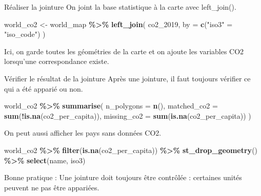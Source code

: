 \documentclass[
  10pt,
  ignorenonframetext,
]{beamer}
\newenvironment{Shaded}{\begin{snugshade}}{\end{snugshade}}
\newcommand{\AttributeTok}[1]{\textcolor[rgb]{0.13,0.29,0.53}{#1}}
\newcommand{\FunctionTok}[1]{\textcolor[rgb]{0.13,0.29,0.53}{\textbf{#1}}}
\newcommand{\NormalTok}[1]{#1}
\newcommand{\OtherTok}[1]{\textcolor[rgb]{0.56,0.35,0.01}{#1}}
\newcommand{\SpecialCharTok}[1]{\textcolor[rgb]{0.81,0.36,0.00}{\textbf{#1}}}
\newcommand{\StringTok}[1]{\textcolor[rgb]{0.31,0.60,0.02}{#1}}
\begin{document}
\begin{frame}[fragile]{Réaliser la jointure}
\label{ruxe9aliser-la-jointure}
On joint la base statistique à la carte avec left\_join().

\begin{Shaded}
\begin{Highlighting}[]
\NormalTok{world\_co2 }\OtherTok{\textless{}{-}}\NormalTok{ world\_map }\SpecialCharTok{\%\textgreater{}\%}
  \FunctionTok{left\_join}\NormalTok{(}
\NormalTok{    co2\_2019,}
    \AttributeTok{by =} \FunctionTok{c}\NormalTok{(}\StringTok{"iso3"} \OtherTok{=} \StringTok{"iso\_code"}\NormalTok{)}
\NormalTok{  )}
\end{Highlighting}
\end{Shaded}

Ici, on garde toutes les géométries de la carte et on ajoute les
variables CO2 lorsqu'une correspondance existe.
\end{frame}

\begin{frame}[fragile]{Vérifier le résultat de la jointure}
\label{vuxe9rifier-le-ruxe9sultat-de-la-jointure}
Après une jointure, il faut toujours vérifier ce qui a été apparié ou
non.

\begin{Shaded}
\begin{Highlighting}[]
\NormalTok{world\_co2 }\SpecialCharTok{\%\textgreater{}\%}
  \FunctionTok{summarise}\NormalTok{(}
    \AttributeTok{n\_polygons =} \FunctionTok{n}\NormalTok{(),}
    \AttributeTok{matched\_co2 =} \FunctionTok{sum}\NormalTok{(}\SpecialCharTok{!}\FunctionTok{is.na}\NormalTok{(co2\_per\_capita)),}
    \AttributeTok{missing\_co2 =} \FunctionTok{sum}\NormalTok{(}\FunctionTok{is.na}\NormalTok{(co2\_per\_capita))}
\NormalTok{  )}
\end{Highlighting}
\end{Shaded}

On peut aussi afficher les pays sans données CO2.

\begin{Shaded}
\begin{Highlighting}[]
\NormalTok{world\_co2 }\SpecialCharTok{\%\textgreater{}\%}
  \FunctionTok{filter}\NormalTok{(}\FunctionTok{is.na}\NormalTok{(co2\_per\_capita)) }\SpecialCharTok{\%\textgreater{}\%}
  \FunctionTok{st\_drop\_geometry}\NormalTok{() }\SpecialCharTok{\%\textgreater{}\%}
  \FunctionTok{select}\NormalTok{(name, iso3)}
\end{Highlighting}
\end{Shaded}

Bonne pratique : Une jointure doit toujours être contrôlée : certaines
unités peuvent ne pas être appariées.
\end{frame}
\end{document}
